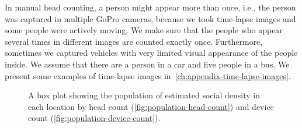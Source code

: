 In manual head counting, a person might appear more than once, i.e., the person was captured in multiple GoPro cameras, because we took time-lapse images and some people were actively moving. We make sure that the people who appear several times in different images are counted exactly once. Furthermore, sometimes we captured vehicles with very limited visual appearance of the people inside. We assume that there are a person in a car and five people in a bus. We present some examples of time-lapse images in~\autoref{ch:appendix-time-lapse-images}.

\begin{figure}[h]
	\begin{adjustwidth}{-1cm}{}
	\centering
	\end{adjustwidth}
	\caption[A box plot of the population]{A box plot showing the population of estimated social density in each location by head count (\ref{fig:population-head-count}) and device count (\ref{fig:population-device-count}).}
	\label{fig:total-population}
\end{figure}

